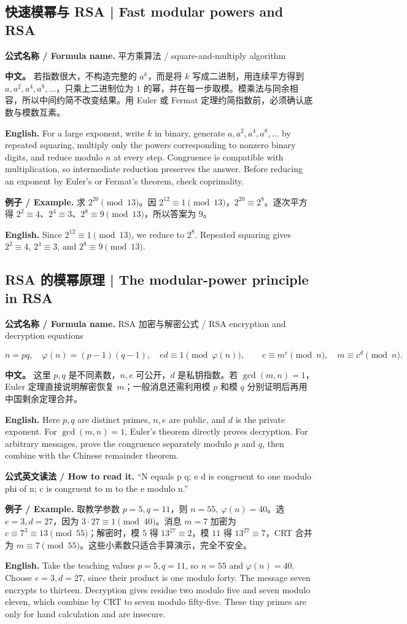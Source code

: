 \documentclass[UTF8,11pt,a4paper]{ctexart}
\newcommand{\EN}[1]{\par\noindent \textbf{English.} #1\par}
\newcommand{\BOTH}[2]{\par\noindent\textbf{中文。} #1\par\noindent\textbf{English.} #2\par}
\newcommand{\FORMULA}[2]{\par\noindent\textbf{公式名称 / Formula name.} #1 / #2\par}
\newcommand{\READ}[1]{\par\noindent \textbf{公式英文读法 / How to read it.} #1\par}
\newcommand{\EX}[2]{\par\noindent \textbf{例子 / Example.} #1\par\EN{#2}}
\begin{document}
\subsection{快速模幂与 RSA | Fast modular powers and RSA}
\FORMULA{平方乘算法}{square-and-multiply algorithm}
\BOTH{若指数很大，不构造完整的 $a^k$，而是将 $k$ 写成二进制，用连续平方得到 $a,a^2,a^4,a^8,\ldots$，只乘上二进制位为 $1$ 的幂，并在每一步取模。模乘法与同余相容，所以中间约简不改变结果。用 Euler 或 Fermat 定理约简指数前，必须确认底数与模数互素。}{For a large exponent, write $k$ in binary, generate $a,a^2,a^4,a^8,\ldots$ by repeated squaring, multiply only the powers corresponding to nonzero binary digits, and reduce modulo $n$ at every step. Congruence is compatible with multiplication, so intermediate reduction preserves the answer. Before reducing an exponent by Euler's or Fermat's theorem, check coprimality.}
\EX{求 $2^{20}\pmod{13}$。因 $2^{12}\equiv1\pmod{13}$，$2^{20}\equiv2^8$。逐次平方得 $2^2\equiv4$、$2^4\equiv3$、$2^8\equiv9\pmod{13}$，所以答案为 $9$。}{Since $2^{12}\equiv1\pmod{13}$, we reduce to $2^8$. Repeated squaring gives $2^2\equiv4$, $2^4\equiv3$, and $2^8\equiv9\pmod{13}$.}
\subsection{RSA 的模幂原理 | The modular-power principle in RSA}
\FORMULA{RSA 加密与解密公式}{RSA encryption and decryption equations}
\[
n=pq,\quad \varphi(n)=(p-1)(q-1),\quad ed\equiv1\pmod{\varphi(n)},\qquad
c\equiv m^e\pmod n,\quad m\equiv c^d\pmod n.
\]
\BOTH{这里 $p,q$ 是不同素数，$n,e$ 可公开，$d$ 是私钥指数。若 $\gcd(m,n)=1$，Euler 定理直接说明解密恢复 $m$；一般消息还需利用模 $p$ 和模 $q$ 分别证明后再用中国剩余定理合并。}{Here $p,q$ are distinct primes, $n,e$ are public, and $d$ is the private exponent. For $\gcd(m,n)=1$, Euler's theorem directly proves decryption. For arbitrary messages, prove the congruence separately modulo $p$ and $q$, then combine with the Chinese remainder theorem.}
\READ{“N equals p q; e d is congruent to one modulo phi of n; c is congruent to m to the e modulo n.”}
\EX{取教学参数 $p=5,q=11$，则 $n=55,\ \varphi(n)=40$。选 $e=3,d=27$，因为 $3\cdot27\equiv1\pmod{40}$。消息 $m=7$ 加密为 $c\equiv7^3\equiv13\pmod{55}$；解密时，模 $5$ 得 $13^{27}\equiv2$，模 $11$ 得 $13^{27}\equiv7$，CRT 合并为 $m\equiv7\pmod{55}$。这些小素数只适合手算演示，完全不安全。}{Take the teaching values $p=5,q=11$, so $n=55$ and $\varphi(n)=40$. Choose $e=3,d=27$, since their product is one modulo forty. The message seven encrypts to thirteen. Decryption gives residue two modulo five and seven modulo eleven, which combine by CRT to seven modulo fifty-five. These tiny primes are only for hand calculation and are insecure.}
\end{document}
